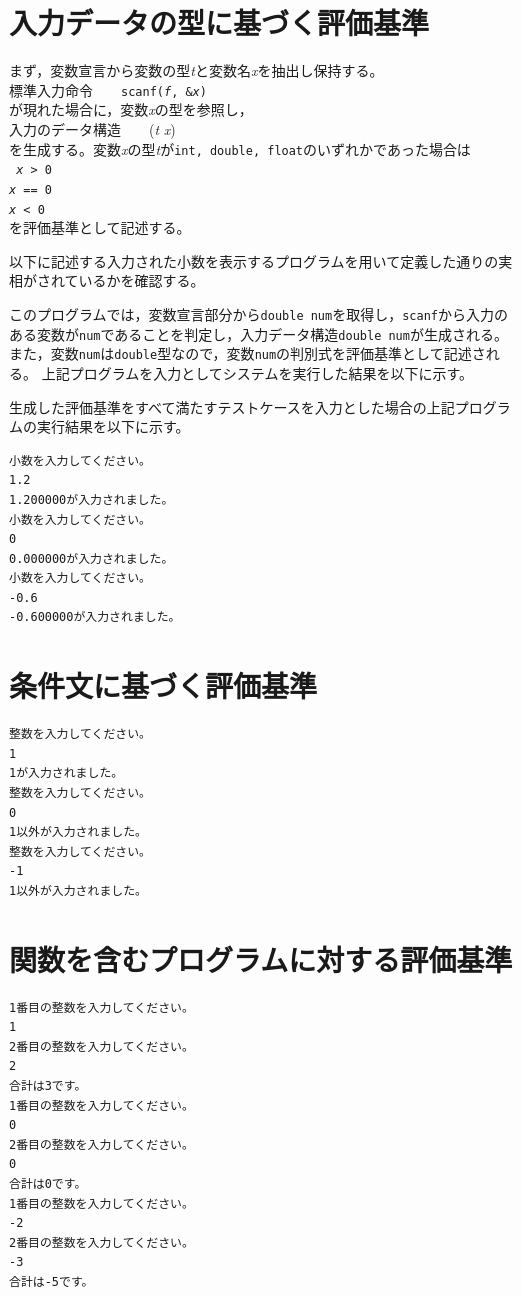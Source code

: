 \documentclass{tpu-sotu}
\begin{document}
\section{入力データの型に基づく評価基準}
まず，変数宣言から変数の型{\it t}と変数名{\it x}を抽出し保持する。\\
標準入力命令　　{\tt scanf({\it f}, \&{\it x}) }\\
が現れた場合に，変数{\it x}の型を参照し，\\
入力のデータ構造　　({\it t} {\it x})\\
を生成する。変数{\it x}の型{\it t}が{\tt int, double, float}のいずれかであった場合は\\
{\tt
{\it x} > 0\\
{\it x} == 0\\
{\it x} < 0\\
}
を評価基準として記述する。

以下に記述する入力された小数を表示するプログラムを用いて定義した通りの実相がされているかを確認する。

このプログラムでは，変数宣言部分から{\tt double num}を取得し，{\tt scanf}から入力のある変数が{\tt num}であることを判定し，入力データ構造{\tt double num}が生成される。また，変数{\tt num}は{\tt double}型なので，変数{\tt num}の判別式を評価基準として記述される。
上記プログラムを入力としてシステムを実行した結果を以下に示す。

生成した評価基準をすべて満たすテストケースを入力とした場合の上記プログラムの実行結果を以下に示す。
\begin{lstlisting}[xleftmargin=1cm]
小数を入力してください。
1.2
1.200000が入力されました。
小数を入力してください。
0
0.000000が入力されました。
小数を入力してください。
-0.6
-0.600000が入力されました。
\end{lstlisting}

\section{条件文に基づく評価基準}



\begin{lstlisting}[xleftmargin=1cm]
整数を入力してください。
1
1が入力されました。
整数を入力してください。
0
1以外が入力されました。
整数を入力してください。
-1
1以外が入力されました。
\end{lstlisting}

\section{関数を含むプログラムに対する評価基準}


\begin{lstlisting}[xleftmargin=1cm]
1番目の整数を入力してください。
1
2番目の整数を入力してください。
2
合計は3です。
1番目の整数を入力してください。
0
2番目の整数を入力してください。
0
合計は0です。
1番目の整数を入力してください。
-2
2番目の整数を入力してください。
-3
合計は-5です。
\end{lstlisting}
\end{document}
